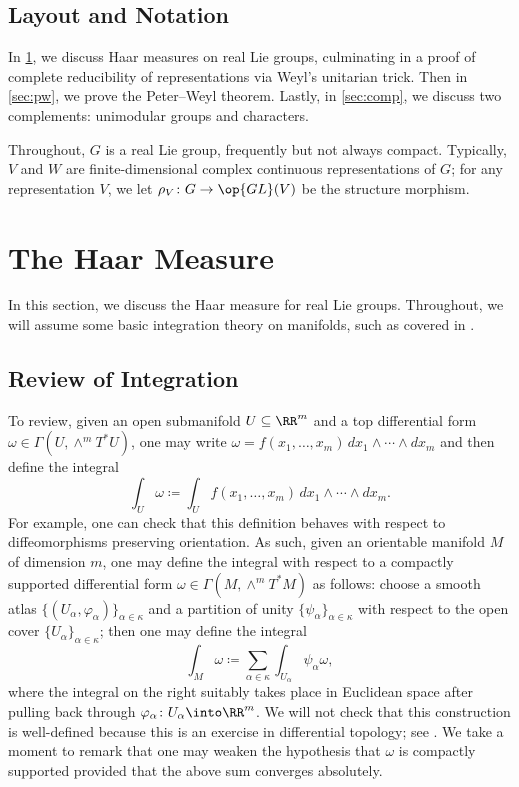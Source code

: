 \documentclass{amsart}
\begin{document}
\subsection{Layout and Notation}
In \cref{sec:haar}, we discuss Haar measures on real Lie groups, culminating in a proof of complete reducibility of representations via Weyl's unitarian trick. Then in \cref{sec:pw}, we prove the Peter--Weyl theorem. Lastly, in \cref{sec:comp}, we discuss two complements: unimodular groups and characters.

Throughout, $G$ is a real Lie group, frequently but not always compact. Typically, $V$ and $W$ are finite-dimensional complex continuous representations of $G$; for any representation $V$, we let $\rho_V\colon G\to\op{GL}(V)$ be the structure morphism.

\section{The Haar Measure} \label{sec:haar}
In this section, we discuss the Haar measure for real Lie groups. Throughout, we will assume some basic integration theory on manifolds, such as covered in \cite[Chapter~16]{lee-manifolds}.

\subsection{Review of Integration} \label{subsec:integrate-manifold}
To review, given an open submanifold $U\subseteq\RR^m$ and a top differential form $\omega\in\Gamma(U,\land^mT^*U)$, one may write $\omega=f(x_1,\ldots,x_m)\,dx_1\land\cdots\land dx_m$ and then define the integral
\[\int_U\omega\coloneqq\int_Uf(x_1,\ldots,x_m)\,dx_1\land\cdots\land dx_m.\]
For example, one can check that this definition behaves with respect to diffeomorphisms preserving orientation. As such, given an orientable manifold $M$ of dimension $m$, one may define the integral with respect to a compactly supported differential form $\omega\in\Gamma(M,\land^mT^*M)$ as follows: choose a smooth atlas $\{(U_\alpha,\varphi_\alpha)\}_{\alpha\in\kappa}$ and a partition of unity $\{\psi_\alpha\}_{\alpha\in\kappa}$ with respect to the open cover $\{U_\alpha\}_{\alpha\in\kappa}$; then one may define the integral
\[\int_M\omega\coloneqq\sum_{\alpha\in\kappa}\int_{U_\alpha}\psi_\alpha\omega,\]
where the integral on the right suitably takes place in Euclidean space after pulling back through $\varphi_\alpha\colon U_\alpha\into\RR^m$. We will not check that this construction is well-defined because this is an exercise in differential topology; see \cite[Propositions~16.3--16.5]{lee-manifolds}. We take a moment to remark that one may weaken the hypothesis that $\omega$ is compactly supported provided that the above sum converges absolutely.
\end{document}
